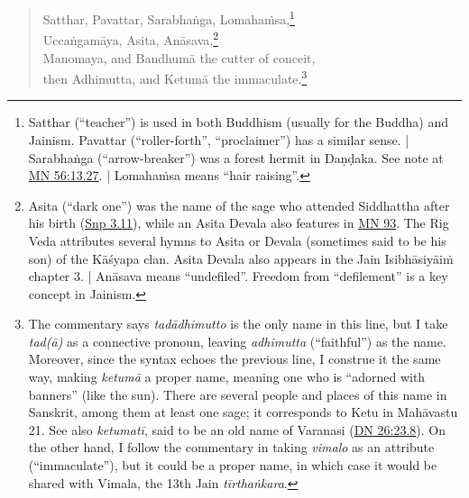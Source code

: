 \documentclass[12pt,openany]{book}%
\begin{document}
\begin{verse}
Satthar, Pavattar, \textsanskrit{Sarabhaṅga}, \textsanskrit{Lomahaṁsa},\footnote{Satthar (“teacher”) is used in both Buddhism (usually for the Buddha) and Jainism. Pavattar (“roller-forth”, “proclaimer”) has a similar sense. | \textsanskrit{Sarabhaṅga} (“arrow-breaker”) was a forest hermit in \textsanskrit{Daṇḍaka}. See note at \href{https://suttacentral.net/mn56/en/sujato\#13.27}{MN 56:13.27}. | \textsanskrit{Lomahaṁsa} means “hair raising”. } \\
\textsanskrit{Uccaṅgamāya}, Asita, \textsanskrit{Anāsava},\footnote{Asita (“dark one”) was the name of the sage who attended Siddhattha after his birth (\href{https://suttacentral.net/snp3.11/en/sujato}{Snp 3.11}), while an Asita Devala also features in \href{https://suttacentral.net/mn93/en/sujato}{MN 93}. The Rig Veda attributes several hymns to Asita or Devala (sometimes said to be his son) of the \textsanskrit{Kāśyapa} clan. Asita Devala also appears in the Jain \textsanskrit{Isibhāsiyāiṁ} chapter 3. | \textsanskrit{Anāsava} means “undefiled”. Freedom from “defilement” is a key concept in Jainism. } \\
Manomaya, and \textsanskrit{Bandhumā} the cutter of conceit, \\
then Adhimutta, and \textsanskrit{Ketumā} the immaculate.\footnote{The commentary says \textit{\textsanskrit{tadādhimutto}} is the only name in this line, but I take \textit{tad(\textsanskrit{ā})} as a connective pronoun, leaving \textit{adhimutta} (“faithful”) as the name. Moreover, since the syntax echoes the previous line, I construe it the same way, making \textit{\textsanskrit{ketumā}} a proper name, meaning one who is “adorned with banners” (like the sun). There are several people and places of this name in Sanskrit, among them at least one sage; it corresponds to Ketu in \textsanskrit{Mahāvastu} 21. See also \textit{\textsanskrit{ketumatī}}, said to be an old name of Varanasi (\href{https://suttacentral.net/dn26/en/sujato\#23.8}{DN 26:23.8}). On the other hand, I follow the commentary in taking \textit{vimalo} as an attribute (“immaculate”), but it could be a proper name, in which case it would be shared with Vimala, the 13th Jain \textit{\textsanskrit{tīrthaṅkara}}. } 


\end{verse}
\end{document}
